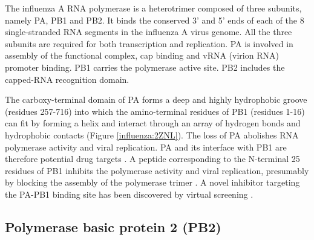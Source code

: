 The influenza A RNA polymerase is a heterotrimer composed of three subunits, namely PA, PB1 and PB2. It binds the conserved 3' and 5' ends of each of the 8 single-stranded RNA segments in the influenza A virus genome. All the three subunits are required for both transcription and replication. PA is involved in assembly of the functional complex, cap binding and vRNA (virion RNA) promoter binding. PB1 carries the polymerase active site. PB2 includes the capped-RNA recognition domain.

The carboxy-terminal domain of PA forms a deep and highly hydrophobic groove (residues 257-716) into which the amino-terminal residues of PB1 (residues 1-16) can fit by forming a helix and interact through an array of hydrogen bonds and hydrophobic contacts \citep{1141} (Figure \ref{influenza:2ZNL}). The loss of PA abolishes RNA polymerase activity and viral replication. PA and its interface with PB1 are therefore potential drug targets \citep{1141}. A peptide corresponding to the N-terminal 25 residues of PB1 inhibits the polymerase activity and viral replication, presumably by blocking the assembly of the polymerase trimer \citep{1234}. A novel inhibitor targeting the PA-PB1 binding site has been discovered by virtual screening \citep{1235}.

\subsection{Polymerase basic protein 2 (PB2)}


